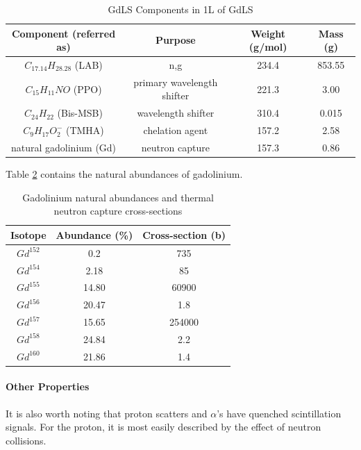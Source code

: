 \begin{table}[!htbp]
    \centering
    \begin{tabular}{c | c | c | c}
    \hline
    {Component (referred as)} & {Purpose} & {Weight (g/mol)} & {Mass (g)} \\ \hline
    $C_{17.14}H_{28.28}$ (LAB) & n,g & 234.4  & 853.55 \\
    $C_{15}H_{11}NO$ (PPO) & primary wavelength shifter & 221.3 & 3.00 \\
    $C_{24}H_{22}$ (Bis-MSB) & wavelength shifter & 310.4 & 0.015 \\
    $C_{9}H_{17}O^{-}_{2}$ (TMHA) & chelation agent & 157.2 & 2.58 \\
    natural gadolinium (Gd) & neutron capture & 157.3 & 0.86 
    \end{tabular}
    \caption{GdLS Components in 1L of GdLS}
    \label{tab:GdLS_Components}
\end{table} 

\par
Table \ref{tab:Gadolinium_abundances_and_crosssections} contains the natural abundances of gadolinium.

\begin{table}[!htbp]
    \centering
    \begin{tabular}{c | c | c}
    \hline
    {Isotope} & {Abundance (\%)} & {Cross-section (b)} \\ \hline
    $Gd^{152}$ & 0.2 & 735 \\
    $Gd^{154}$ & 2.18 & 85 \\
    $Gd^{155}$ & 14.80 & 60900 \\
    $Gd^{156}$ & 20.47 & 1.8 \\
    $Gd^{157}$ & 15.65 & 254000 \\
    $Gd^{158}$ & 24.84 & 2.2 \\
    $Gd^{160}$ & 21.86 & 1.4

    \end{tabular}
    \caption{Gadolinium natural abundances and thermal neutron capture cross-sections \cite{Gadolinium_abundances_and_crosssection_ref}}
    \label{tab:Gadolinium_abundances_and_crosssections}
\end{table} 

\paragraph{Other Properties}
It is also worth noting that proton scatters and $\alpha$'s have quenched scintillation signals.
For the proton, it is most easily described by the effect of neutron collisions.

